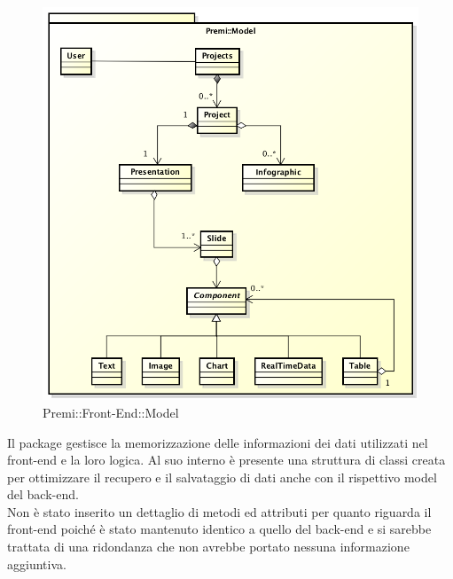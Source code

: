 \begin{figure}[h]
	\centering
	\includegraphics[width=0.7\linewidth]{img/premi_model}
	\caption[Premi::Front-End::Model]{Premi::Front-End::Model}
\end{figure}
Il package gestisce la memorizzazione delle informazioni dei dati utilizzati nel front-end e la loro logica. Al suo interno è presente una struttura di classi creata per ottimizzare il recupero e il salvataggio di dati anche con il rispettivo model del back-end.\\
Non è stato inserito un dettaglio di metodi ed attributi per quanto riguarda il front-end poiché è stato mantenuto identico a quello del back-end e si sarebbe trattata di una ridondanza che non avrebbe portato nessuna informazione aggiuntiva.